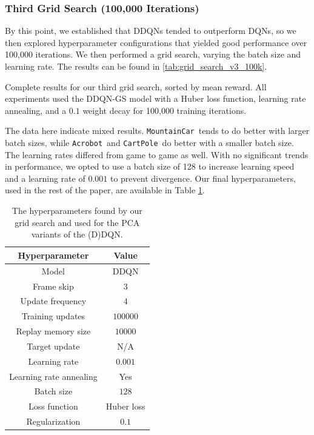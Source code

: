 \documentclass[11pt]{article}
\newcommand{\cp}{\texttt{CartPole}}
\newcommand{\ab}{\texttt{Acrobot}}
\newcommand{\mc}{\texttt{MountainCar}}
\begin{document}
\subsubsection{Third Grid Search (100,000 Iterations)}

By this point, we established that DDQNs tended to outperform DQNs, so we then explored hyperparameter configurations that yielded good performance over 100,000 iterations. We then performed a grid search, varying the batch size and learning rate. The results can be found in \ref{tab:grid_search_v3_100k}.

\begin{table}[!ht]
    \footnotesize
    \centering
    
    
    \caption{Complete results for our third grid search, sorted by mean reward. All experiments used the DDQN-GS model with a Huber loss function, learning rate annealing, and a $0.1$ weight decay for 100,000 training iterations.}
    \label{tab:grid_search_v3_100k}
\end{table}

The data here indicate mixed results. \mc~tends to do better with larger batch sizes, while \ab~and \cp~do better with a smaller batch size. The learning rates differed from game to game as well. With no significant trends in performance, we opted to use a batch size of 128 to increase learning speed and a learning rate of $0.001$ to prevent divergence. Our final hyperparameters, used in the rest of the paper, are available in Table \ref{tab:grid_search_hyperparameters}.

\begin{table}[!ht]
    \footnotesize
    \centering
    \begin{tabular}{c|c}
        \toprule
        Hyperparameter & Value \\ \midrule
        Model & DDQN \\
        Frame skip & $3$ \\
        Update frequency & $4$ \\
        Training updates & $100000$ \\
        Replay memory size & $10000$ \\
        Target update & N/A \\
        Learning rate & $0.001$ \\
        Learning rate annealing & Yes \\
        Batch size & $128$ \\
        Loss function & Huber loss \\
        Regularization & $0.1$ \\
        \bottomrule
    \end{tabular}
    \caption{The hyperparameters found by our grid search and used for the PCA variants of the (D)DQN.}
    \label{tab:grid_search_hyperparameters}
\end{table}
\end{document}

